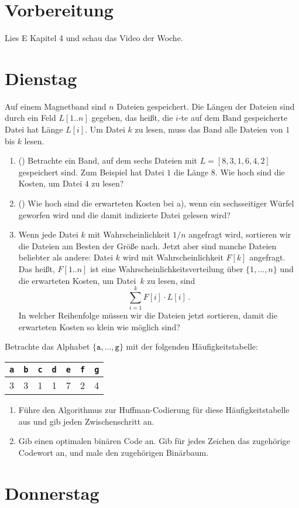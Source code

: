 \documentclass{uebung_cs}
\begin{document}
\section*{Vorbereitung}
Lies E Kapitel 4 und schau das Video der Woche.

\section*{Dienstag}
\begin{aufgabe}
    Auf einem Magnetband sind $n$ Dateien gespeichert.
    Die Längen der Dateien sind durch ein Feld $L[1..n]$ gegeben, das heißt, die $i$-te auf dem Band gespeicherte Datei hat Länge $L[i]$.
    Um Datei $k$ zu lesen, muss das Band alle Dateien von $1$ bis $k$ lesen.
    \begin{enumerate}
        \item(\warmup) Betrachte ein Band, auf dem sechs Dateien mit $L=[8,3,1,6,4,2]$ gespeichert sind. Zum Beispiel hat Datei $1$ die Länge $8$.
        Wie hoch sind die Kosten, um Datei $4$ zu lesen?
        \item(\warmup) Wie hoch sind die erwarteten Kosten bei a), wenn ein sechsseitiger Würfel geworfen wird und die damit indizierte Datei gelesen wird?
        \item Wenn jede Datei $k$ mit Wahrscheinlichkeit $1/n$ angefragt wird, sortieren wir die Dateien am Besten der Größe nach. Jetzt aber sind manche Dateien beliebter als andere: Datei $k$ wird mit Wahrscheinlichkeit $F[k]$ angefragt. Das heißt, $F[1..n]$ ist eine Wahrscheinlichkeitsverteilung über $\{1,\dots,n\}$ und die erwarteten Kosten, um Datei~$k$ zu lesen, sind
        \[\sum_{i=1}^k F[i]\cdot L[i]\,.\]
        In welcher Reihenfolge müssen wir die Dateien jetzt sortieren, damit die erwarteten Kosten so klein wie möglich sind?
    \end{enumerate}
\end{aufgabe}


\begin{aufgabe}[Scheduling]
\end{aufgabe}


\begin{aufgabe}
    Betrachte das Alphabet $\{\texttt{a},\dots,\texttt{g}\}$ mit der folgenden Häufigkeitstabelle:
	\begin{center}
		\begin{tabular}{ccccccc}
			\texttt{a}&\texttt{b}&\texttt{c}&\texttt{d}&\texttt{e}&\texttt{f}&\texttt{g}\\\hline
			3&3&1&1&7&2&4\\
		\end{tabular}
	\end{center}
    \begin{enumerate}
        \item Führe den Algorithmus zur Huffman-Codierung für diese Häufigkeitstabelle aus und gib jeden Zwischenschritt an.
        \item Gib einen optimalen binären Code an. Gib für jedes Zeichen das zugehörige Codewort an, und male den zugehörigen Binärbaum.
    \end{enumerate}
\end{aufgabe}


\section*{Donnerstag}
\begin{aufgabe}
\end{aufgabe}
\end{document}
